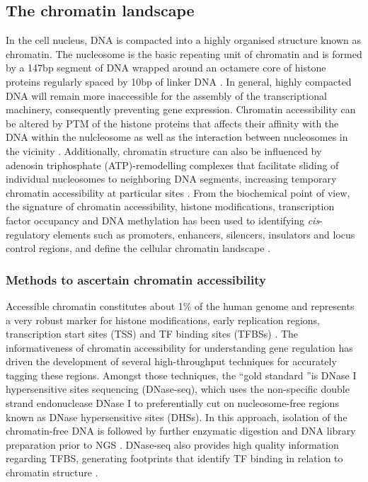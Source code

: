 \subsection{The chromatin landscape}
In the cell nucleus, DNA is compacted into a highly organised structure known as chromatin. The nucleosome is the basic repeating unit of chromatin and is formed by a 147bp segment of DNA wrapped around an octamere core of histone proteins regularly spaced by 10bp of linker DNA \parencite{Luger1997}. In general, highly compacted DNA will remain more inaccessible for the assembly of the transcriptional machinery, consequently preventing gene expression. Chromatin accessibility can be altered by PTM of the histone proteins that affects their affinity with the DNA within the nulcleosome as well as the interaction between nucleosomes in the vicinity \parencite{Polach2000,Pepenella2014}. Additionally, chromatin structure can also be influenced by adenosin triphosphate (ATP)-remodelling complexes that facilitate sliding of individual nucleosomes to neighboring DNA segments, increasing temporary chromatin accessibility at particular sites \parencite{Cosma1999}. From the biochemical point of view, the signature of chromatin accessibility, histone modifications, transcription factor occupancy and DNA methylation has been used to identifying \textit{cis}-regulatory elements such as promoters, enhancers, silencers, insulators and locus control regions, and define the cellular chromatin landscape \parencite{Boyle2012,Kundaje2015}.



\subsubsection{Methods to ascertain chromatin accessibility}

Accessible chromatin constitutes about 1\% of the human genome and represents a very robust marker for histone modifications, early replication regions, transcription start sites (TSS) and TF binding sites (TFBSs) \parencite{ENCODE2007}. The informativeness of chromatin accessibility for understanding gene regulation has driven the development of several high-throughput techniques for accurately tagging these regions. Amongst those techniques, the \textquotedblleft gold standard \textquotedblright is DNase I hypersensitive sites sequencing (DNase-seq), which uses the non-specific double strand endonuclease DNase I to preferentially cut on nucleosome-free regions known as DNase hypersensitive sites (DHSs). In this approach, isolation of the chromatin-free DNA is followed by further enzymatic digestion and DNA library preparation prior to NGS \parencite{John2013}. DNase-seq also provides high quality information regarding TFBS, generating footprints that identify TF binding in relation to chromatin structure \parencite{Hesselberth2009,Boyle2010}. 

